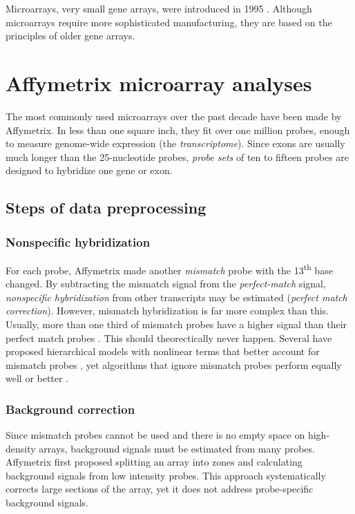 Microarrays, very small gene arrays, were introduced in 1995 \cite{Schena:1995fy}. 
Although microarrays require more sophisticated
manufacturing, they are based on the principles of older gene arrays.


\section{Affymetrix microarray analyses}

The most commonly used microarrays over the past decade
have been made by Affymetrix.
In less than one square inch, they fit over one million probes, enough
to measure genome-wide expression (the \textit{transcriptome}).
Since exons are usually much longer than the 25-nucleotide probes,
\textit{probe sets} of ten to fifteen probes are designed to hybridize
one gene or exon.

\subsection{Steps of data preprocessing}

\subsubsection{Nonspecific hybridization}

For each probe, Affymetrix made another
\textit{mismatch} probe with the 13\textsuperscript{th} 
base changed. 
By subtracting the mismatch signal from the \textit{perfect-match} signal,
\textit{nonspecific hybridization} from other transcripts may be 
estimated (\textit{perfect match correction}).
However, mismatch hybridization is far more complex than this.
Usually, more than one third of mismatch probes have a higher
signal than their perfect match probes \cite{Irizarry:2003ge}. 
This should theorectically never happen. Several have proposed
hierarchical models with nonlinear terms that
better account for mismatch probes 
\cite{Li:2001jv,Milo:2003tt,Liu:2005ey,Hein:2005ip}, yet algorithms
that ignore mismatch probes perform equally
well or better \cite{Chen:2007cr,Irizarry:2003ge,Hochreiter:2006ja}.

\subsubsection{Background correction}

Since mismatch probes cannot be used and there is no 
empty space on high-density arrays, 
background signals must be estimated from many
probes. Affymetrix first proposed splitting an array
into zones and calculating background signals from low
intensity probes. This approach systematically corrects large
sections of the array,
yet it does not address probe-specific background signals.

